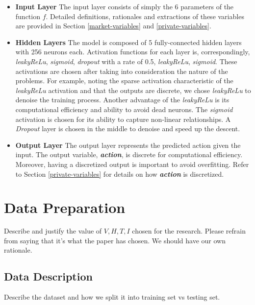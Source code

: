 \documentclass[12pt]{extarticle}
\begin{document}
\begin{itemize}
\item \textbf{Input Layer} The input layer consists of simply the 6 parameters of the function $f$.
Detailed definitions, rationales and extractions of these variables are
provided in Section \ref{market-variables} and \ref{private-variables}.

\item \textbf{Hidden Layers} The model is composed of 5 fully-connected hidden layers with
256 neurons each. Activation functions for each layer is, correspondingly,
\textit{leakyReLu},
\textit{sigmoid}, \textit{dropout} with a rate of 0.5,
\textit{leakyReLu}, \textit{sigmoid}. These activations are
chosen after taking into consideration the nature of the
problems. For example, noting the sparse activation characteristic of
the \textit{leakyReLu} activation and that the outputs are discrete, we chose \textit{leakyReLu}
to denoise the training process. Another advantage of the \textit{leakyReLu}
is its computational efficiency and ability to avoid dead neurons.
The \textit{sigmoid} activation is chosen for its ability to capture
non-linear relationships. A \textit{Dropout} layer is chosen
in the middle to denoise and speed up the descent. \\

\item \textbf{Output Layer} The output layer represents the predicted action given
the input. The output variable, \textit{\textbf{action}}, is discrete for computational
efficiency. Moreover, having a discretized output is important to avoid overfitting.
Refer to Section \ref{private-variables} for details on how \textit{\textbf{action}}
is discretized.

\end{itemize}


\section{Data Preparation}
Describe and justify the value of $V, H, T, I$ chosen for the research. Please
refrain from saying that it's what the paper has chosen. We should have our own
rationale.

\subsection{Data Description}

Describe the dataset and how we split it into training set vs testing set.
\end{document}
